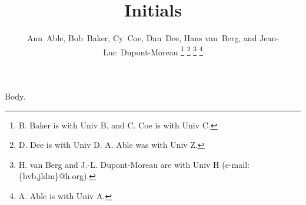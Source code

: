 \documentclass[journal]{IEEEtran}
\begin{document}
\title{Initials}
\author{Ann~Able, Bob~Baker, Cy~Coe, Dan~Dee, Hans van~Berg, and Jean-Luc~Dupont-Moreau%
\thanks{B. Baker is with Univ B, and C. Coe is with Univ C.}
\thanks{D. Dee is with Univ D. A. Able was with Univ Z.}
\thanks{H. van Berg and J.-L. Dupont-Moreau are with Univ H (e-mail: \{hvb,jldm\}@h.org).}
\thanks{A. Able is with Univ A.}}
\maketitle
Body.
\end{document}
